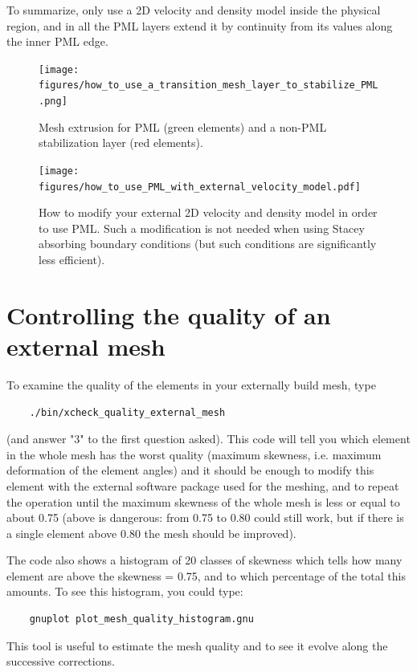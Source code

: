To summarize, only use a 2D velocity and density model inside the physical region, and in
all the PML layers extend it by continuity from its values along the
inner PML edge.

\begin{figure}[htbp]
\noindent \begin{centering}
\texttt{[image: figures/how\_to\_use\_a\_transition\_mesh\_layer\_to\_stabilize\_PML.png]}
\par\end{centering}
\caption{Mesh extrusion for PML (green elements) and a non-PML stabilization layer (red elements).}
\label{fig:mesh_extrusion}
\end{figure}

\begin{figure}[htbp]
\centering
\texttt{[image: figures/how\_to\_use\_PML\_with\_external\_velocity\_model.pdf]}
\caption{How to modify your external 2D velocity and density model in order to use PML.
Such a modification is not needed when using Stacey absorbing boundary conditions (but such conditions
are significantly less efficient).}
\label{fig:modify_external_velocity_model_to_use_PML}
\end{figure}

\section{Controlling the quality of an external mesh}

To examine the quality of the elements in your externally build mesh, type
%
\begin{verbatim}
    ./bin/xcheck_quality_external_mesh
\end{verbatim}
%
(and answer "3" to the first question asked).
This code will tell you which element in the whole mesh has the worst quality (maximum skewness, i.e. maximum deformation of the element angles) and it should be enough to modify this element with the external software package used for the meshing, and
to repeat the operation until the maximum skewness of the whole mesh is less or equal to about 0.75 (above is dangerous: from 0.75 to 0.80 could still work, but if there is a single element above 0.80 the mesh should be improved).

The code also shows a histogram of 20 classes of skewness which tells how many element are above the skewness = 0.75, and to which percentage of the total this amounts. To see this histogram, you could type:
%
\begin{verbatim}
    gnuplot plot_mesh_quality_histogram.gnu
\end{verbatim}
%
This tool is useful to estimate the mesh quality and to see it evolve along the successive corrections.

